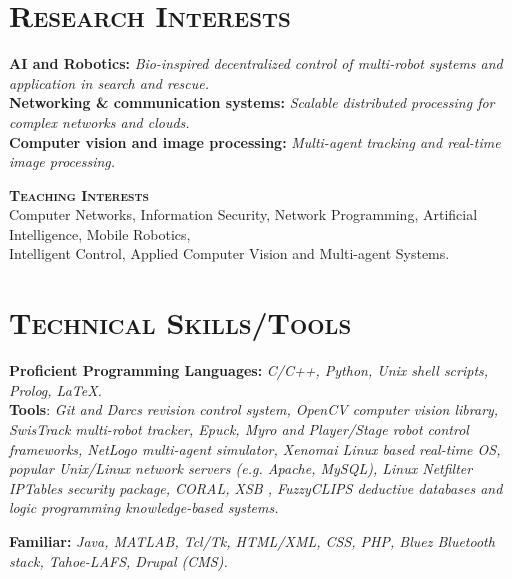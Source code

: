 \documentclass[notopicbreak,contbibnum,plain]{simplecv}
\begin{document}
\section{\textsc{Research Interests}}
\begin{topic}
\vspace*{-0.3cm}
\item \textbf{AI and Robotics:} \textit{Bio-inspired decentralized control of multi-robot systems and application in search and rescue.}\\
\textbf{Networking \& communication systems:} \textit{Scalable distributed processing for complex networks and clouds.}\\    
\textbf{Computer vision and image processing:}\textit{ Multi-agent tracking and real-time image processing.}
\item \textbf{\textsc{Teaching Interests}}\\ Computer Networks, Information Security, Network Programming, Artificial Intelligence, Mobile Robotics,\\ Intelligent Control, Applied Computer Vision and Multi-agent Systems.
\vspace*{-0.25cm}
\end{topic}
\section{\textsc{Technical Skills/Tools}}
\vspace*{-0.3cm}
\begin{topic}
\item \textbf{Proficient Programming Languages:} \textit{C/C++, Python, Unix shell scripts, Prolog, LaTeX.}\\
	\textbf{Tools}: \textit{Git and Darcs revision control system, OpenCV computer vision library, SwisTrack multi-robot tracker, Epuck, Myro and Player/Stage robot control frameworks, NetLogo multi-agent simulator, Xenomai Linux based real-time OS, popular Unix/Linux network servers (e.g. Apache, MySQL), Linux Netfilter IPTables security package, CORAL, XSB , FuzzyCLIPS deductive databases and  logic programming knowledge-based systems.}
\vspace*{-0.1cm}
\item \textbf{Familiar:}
\textit{Java, MATLAB, Tcl/Tk, HTML/XML, CSS, PHP, Bluez Bluetooth stack, Tahoe-LAFS, Drupal (CMS).}
\vspace*{-0.3cm}
\end{topic}
\vspace*{-0.3cm}
\end{document}
